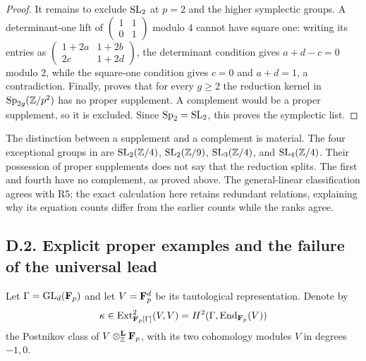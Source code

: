 \begin{proof}
It remains to exclude $\operatorname{SL}_2$ at $p=2$ and the higher symplectic groups.  A determinant-one lift of $\left(\begin{smallmatrix}1&1\\0&1\end{smallmatrix}\right)$ modulo $4$ cannot have square one: writing its entries as $\left(\begin{smallmatrix}1+2a&1+2b\\2c&1+2d\end{smallmatrix}\right)$, the determinant condition gives $a+d-c=0$ modulo $2$, while the square-one condition gives $c=0$ and $a+d=1$, a contradiction.  Finally, \cite[Theorem~2.5]{DetinkoFlanneryHulpke2018} proves that for every $g\geq2$ the reduction kernel in $\operatorname{Sp}_{2g}(\mathbb Z/p^2)$ has no proper supplement.  A complement would be a proper supplement, so it is excluded.  Since $\operatorname{Sp}_2=\operatorname{SL}_2$, this proves the symplectic list.
\end{proof}

\begin{remark}
The distinction between a supplement and a complement is material.  The four exceptional groups in \cite[Theorem~2.5]{DetinkoFlanneryHulpke2018} are $\operatorname{SL}_2(\mathbb Z/4)$, $\operatorname{SL}_2(\mathbb Z/9)$, $\operatorname{SL}_3(\mathbb Z/4)$, and $\operatorname{SL}_4(\mathbb Z/4)$.  Their possession of proper supplements does not say that the reduction splits.  The first and fourth have no complement, as proved above.  The general-linear classification agrees with R5; the exact calculation here retains redundant relations, explaining why its equation counts differ from the earlier counts while the ranks agree.
\end{remark}

\subsection{D.2. Explicit proper examples and the failure of the universal lead}

Let $\Gamma=\operatorname{GL}_d(\mathbf F_p)$ and let $V=\mathbf F_p^d$ be its tautological representation.  Denote by
\[
 \kappa\in\operatorname{Ext}^2_{\mathbf F_p[\Gamma]}(V,V)
       =H^2(\Gamma,\operatorname{End}_{\mathbf F_p}(V))
\]
the Postnikov class of $V\otimes^{\mathbf L}_{\mathbb Z}\mathbf F_p$, with its two cohomology modules $V$ in degrees $-1,0$.


